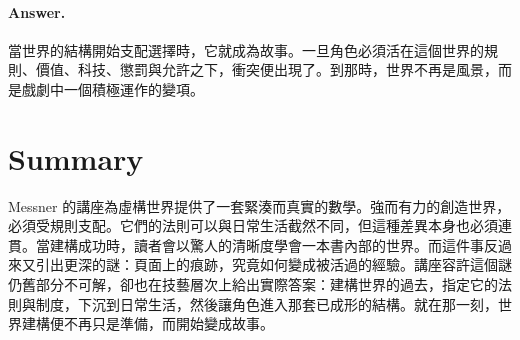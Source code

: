 \paragraph{Answer.} 當世界的結構開始支配選擇時，它就成為故事。一旦角色必須活在這個世界的規則、價值、科技、懲罰與允許之下，衝突便出現了。到那時，世界不再是風景，而是戲劇中一個積極運作的變項。

\section{Summary}

Messner 的講座為虛構世界提供了一套緊湊而真實的數學。強而有力的創造世界，必須受規則支配。它們的法則可以與日常生活截然不同，但這種差異本身也必須連貫。當建構成功時，讀者會以驚人的清晰度學會一本書內部的世界。而這件事反過來又引出更深的謎：頁面上的痕跡，究竟如何變成被活過的經驗。講座容許這個謎仍舊部分不可解，卻也在技藝層次上給出實際答案：建構世界的過去，指定它的法則與制度，下沉到日常生活，然後讓角色進入那套已成形的結構。就在那一刻，世界建構便不再只是準備，而開始變成故事。